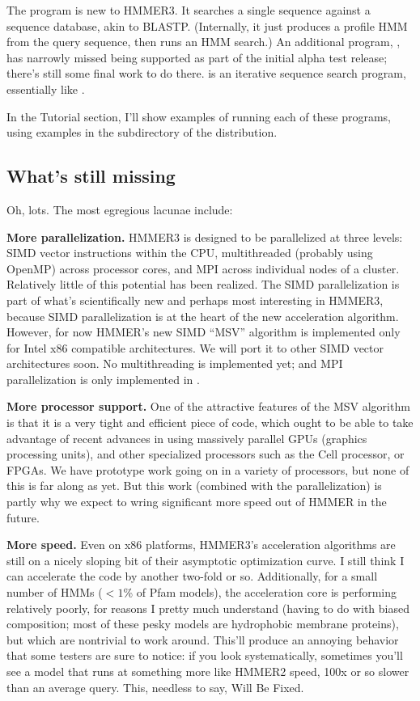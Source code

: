 The  program is new to HMMER3. It searches a single
sequence against a sequence database, akin to BLASTP. (Internally, it
just produces a profile HMM from the query sequence, then runs an HMM
search.) An additional program, , has narrowly missed
being supported as part of the initial alpha test release; there's
still some final work to do there.  is an iterative
sequence search program, essentially like . 

In the Tutorial section, I'll show examples of running each of these
programs, using examples in the  subdirectory of the
distribution.




\subsection{What's still missing}

Oh, lots. The most egregious lacunae include:

\textbf{More parallelization.} HMMER3 is designed to be parallelized
at three levels: SIMD vector instructions within the CPU,
multithreaded (probably using OpenMP) across processor cores, and MPI
across individual nodes of a cluster. Relatively little of this
potential has been realized. The SIMD parallelization is part of
what's scientifically new and perhaps most interesting in HMMER3,
because SIMD parallelization is at the heart of the new acceleration
algorithm. However, for now HMMER's new SIMD ``MSV'' algorithm is
implemented only for Intel x86 compatible architectures. We will port
it to other SIMD vector architectures soon. No multithreading is
implemented yet; and MPI parallelization is only implemented in
.

\textbf{More processor support.} One of the attractive features of the
MSV algorithm is that it is a very tight and efficient piece of code,
which ought to be able to take advantage of recent advances in using
massively parallel GPUs (graphics processing units), and other
specialized processors such as the Cell processor, or FPGAs. We have
prototype work going on in a variety of processors, but none of this
is far along as yet. But this work (combined with the parallelization)
is partly why we expect to wring significant more speed out of HMMER
in the future.

\textbf{More speed.} Even on x86 platforms, HMMER3's acceleration
algorithms are still on a nicely sloping bit of their asymptotic
optimization curve. I still think I can accelerate the code by another
two-fold or so. Additionally, for a small number of HMMs ($<1$\% of
Pfam models), the acceleration core is performing relatively poorly,
for reasons I pretty much understand (having to do with biased
composition; most of these pesky models are hydrophobic membrane
proteins), but which are nontrivial to work around. This'll produce an
annoying behavior that some testers are sure to notice: if you look
systematically, sometimes you'll see a model that runs at something
more like HMMER2 speed, 100x or so slower than an average query. This,
needless to say, Will Be Fixed.

